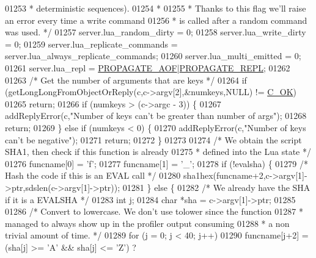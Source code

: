 \begin{DoxyCode}
{{{{{{{{{{{01253 \textcolor{comment}{     * deterministic sequences).}
01254 \textcolor{comment}{     *}
01255 \textcolor{comment}{     * Thanks to this flag we'll raise an error every time a write command}
01256 \textcolor{comment}{     * is called after a random command was used. */}
01257     server.lua\_random\_dirty = 0;
01258     server.lua\_write\_dirty = 0;
01259     server.lua\_replicate\_commands = server.lua\_always\_replicate\_commands;
01260     server.lua\_multi\_emitted = 0;
01261     server.lua\_repl = \hyperlink{server_8h_a542fb79924ca427c866fd63632f60777}{PROPAGATE\_AOF}|\hyperlink{server_8h_a59c6e025b4ed85642a0472fc3e73e298}{PROPAGATE\_REPL};
01262 
01263     \textcolor{comment}{/* Get the number of arguments that are keys */}
01264     \textcolor{keywordflow}{if} (getLongLongFromObjectOrReply(c,c->argv[2],&numkeys,NULL) != \hyperlink{server_8h_a303769ef1065076e68731584e758d3e1}{C\_OK})
01265         \textcolor{keywordflow}{return};
01266     \textcolor{keywordflow}{if} (numkeys > (c->argc - 3)) \{
01267         addReplyError(c,\textcolor{stringliteral}{"Number of keys can't be greater than number of args"});
01268         \textcolor{keywordflow}{return};
01269     \} \textcolor{keywordflow}{else} \textcolor{keywordflow}{if} (numkeys < 0) \{
01270         addReplyError(c,\textcolor{stringliteral}{"Number of keys can't be negative"});
01271         \textcolor{keywordflow}{return};
01272     \}
01273 
01274     \textcolor{comment}{/* We obtain the script SHA1, then check if this function is already}
01275 \textcolor{comment}{     * defined into the Lua state */}
01276     funcname[0] = \textcolor{stringliteral}{'f'};
01277     funcname[1] = \textcolor{stringliteral}{'\_'};
01278     \textcolor{keywordflow}{if} (!evalsha) \{
01279         \textcolor{comment}{/* Hash the code if this is an EVAL call */}
01280         sha1hex(funcname+2,c->argv[1]->ptr,sdslen(c->argv[1]->ptr));
01281     \} \textcolor{keywordflow}{else} \{
01282         \textcolor{comment}{/* We already have the SHA if it is a EVALSHA */}
01283         \textcolor{keywordtype}{int} j;
01284         \textcolor{keywordtype}{char} *sha = c->argv[1]->ptr;
01285 
01286         \textcolor{comment}{/* Convert to lowercase. We don't use tolower since the function}
01287 \textcolor{comment}{         * managed to always show up in the profiler output consuming}
01288 \textcolor{comment}{         * a non trivial amount of time. */}
01289         \textcolor{keywordflow}{for} (j = 0; j < 40; j++)
01290             funcname[j+2] = (sha[j] >= \textcolor{stringliteral}{'A'} && sha[j] <= \textcolor{stringliteral}{'Z'}) ?
}}}}}}}}}}}
\end{DoxyCode}

